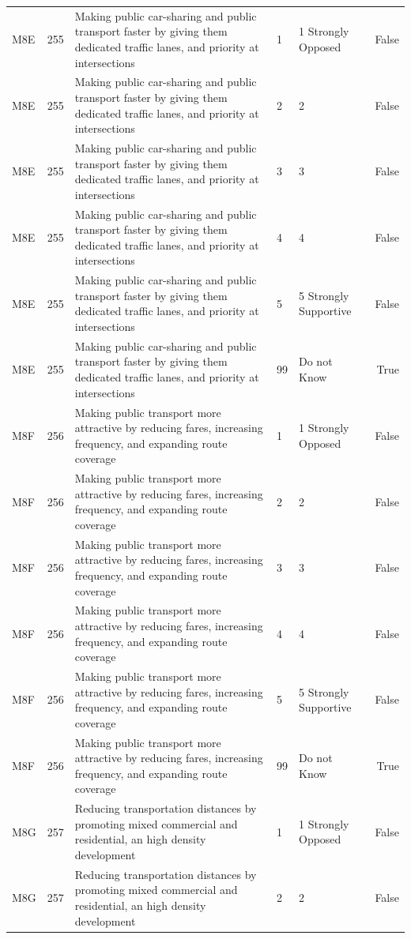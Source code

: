 \begin{tabular}{lrlllr}
M8E & 255 & Making public car-sharing and public transport faster by giving them dedicated traffic lanes, and priority at intersections & 1 & 1 Strongly Opposed & False \\
M8E & 255 & Making public car-sharing and public transport faster by giving them dedicated traffic lanes, and priority at intersections & 2 & 2 & False \\
M8E & 255 & Making public car-sharing and public transport faster by giving them dedicated traffic lanes, and priority at intersections & 3 & 3 & False \\
M8E & 255 & Making public car-sharing and public transport faster by giving them dedicated traffic lanes, and priority at intersections & 4 & 4 & False \\
M8E & 255 & Making public car-sharing and public transport faster by giving them dedicated traffic lanes, and priority at intersections & 5 & 5 Strongly Supportive & False \\
M8E & 255 & Making public car-sharing and public transport faster by giving them dedicated traffic lanes, and priority at intersections & 99 & Do not Know & True \\
M8F & 256 & Making public transport more attractive by reducing fares, increasing frequency, and expanding route coverage & 1 & 1 Strongly Opposed & False \\
M8F & 256 & Making public transport more attractive by reducing fares, increasing frequency, and expanding route coverage & 2 & 2 & False \\
M8F & 256 & Making public transport more attractive by reducing fares, increasing frequency, and expanding route coverage & 3 & 3 & False \\
M8F & 256 & Making public transport more attractive by reducing fares, increasing frequency, and expanding route coverage & 4 & 4 & False \\
M8F & 256 & Making public transport more attractive by reducing fares, increasing frequency, and expanding route coverage & 5 & 5 Strongly Supportive & False \\
M8F & 256 & Making public transport more attractive by reducing fares, increasing frequency, and expanding route coverage & 99 & Do not Know & True \\
M8G & 257 & Reducing transportation distances by promoting mixed commercial and residential, an high density development & 1 & 1 Strongly Opposed & False \\
M8G & 257 & Reducing transportation distances by promoting mixed commercial and residential, an high density development & 2 & 2 & False \\

\end{tabular}
